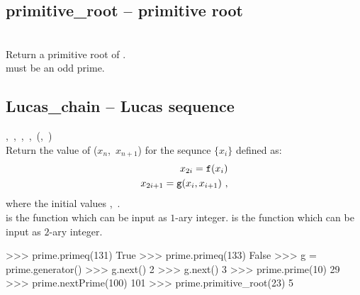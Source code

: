  \subsection{primitive\_root -- primitive root}
   {}{}\\
   \spacing
   \quad Return a primitive root of .\\
   \spacing
   \quad {} must be an odd prime.
%
 \subsection{Lucas\_chain -- Lucas sequence}
   {,\ ,\ ,\ ,\ }{(,\ )}\\
   \spacing
   \quad Return the value of ($x_n$,\ $x_{n+1}$) for the sequnce $\{ x_i \}$ defined as:\\
   \begin{eqnarray*}
      x_{2i} = {\texttt f}(x_i)\\
      x_{2i+1} = {\texttt g}(x_i, x_{i+1})\ ,
   \end{eqnarray*}
   where the initial values ,\ .\\
   \spacing
   \quad {} is the function which can be input as $1$-ary integer.
    is the function which can be input as $2$-ary integer.\\
%
\begin{ex}
>>> prime.primeq(131)
True
>>> prime.primeq(133)
False
>>> g = prime.generator()
>>> g.next()
2
>>> g.next()
3
>>> prime.prime(10)
29
>>> prime.nextPrime(100)
101
>>> prime.primitive_root(23)
5
\end{ex}%
\C



